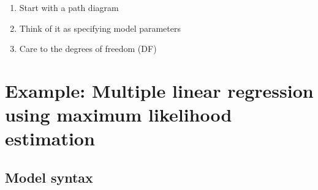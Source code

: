 \documentclass[
]{book}
\begin{document}
\begin{enumerate}
\def\labelenumi{\arabic{enumi}.}
\item
  Start with a path diagram
\item
  Think of it as specifying model parameters
\item
  Care to the degrees of freedom (DF)
\end{enumerate}

\section{Example: Multiple linear regression using maximum likelihood estimation}\label{example-multiple-linear-regression-using-maximum-likelihood-estimation}

\subsection{Model syntax}\label{model-syntax}
\end{document}
